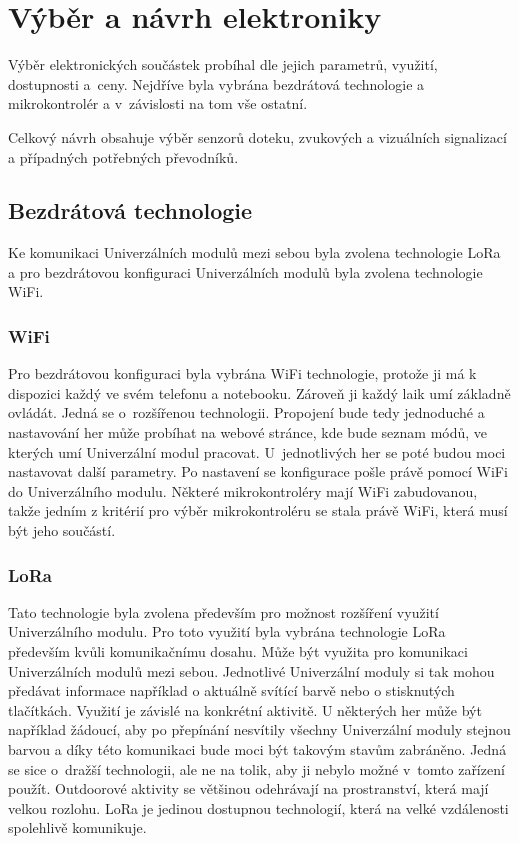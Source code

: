 \chapter{Výběr a návrh elektroniky}
Výběr elektronických součástek probíhal dle jejich parametrů, využití, dostupnosti a~ceny. Nejdříve byla vybrána bezdrátová technologie a mikrokontrolér a v~závislosti 
na tom vše ostatní. 

Celkový návrh obsahuje výběr senzorů doteku, zvukových a vizuálních signalizací a případných potřebných převodníků. 

\section{Bezdrátová technologie}
Ke komunikaci Univerzálních modulů mezi sebou byla zvolena technologie LoRa a pro bezdrátovou konfiguraci Univerzálních modulů byla zvolena technologie WiFi. 

\subsection{WiFi}
Pro bezdrátovou konfiguraci byla vybrána WiFi technologie, protože ji má k dispozici každý ve svém telefonu a notebooku. Zároveň ji každý laik umí základně ovládát. Jedná se 
o~rozšířenou technologii. 
Propojení bude tedy jednoduché a nastavování her může probíhat na webové stránce, kde bude seznam módů, ve kterých umí Univerzální modul pracovat. U~jednotlivých her se poté 
budou moci nastavovat 
další parametry. Po nastavení se konfigurace pošle právě pomocí WiFi do Univerzálního modulu. Některé mikrokontroléry mají WiFi zabudovanou, takže jedním z kritérií pro výběr 
mikrokontroléru se stala právě WiFi, která musí být jeho součástí. 

\subsection{LoRa}
Tato technologie byla zvolena především pro možnost rozšíření využití Univerzálního modulu. Pro toto využití byla vybrána technologie LoRa především kvůli komunikačnímu dosahu. 
Může být využita pro komunikaci Univerzálních modulů mezi sebou. Jednotlivé Univerzální moduly si tak mohou předávat informace například o aktuálně svítící barvě nebo o 
stisknutých tlačítkách. Využití je
závislé na konkrétní aktivitě. U některých her může být například žádoucí, aby po přepínání nesvítily všechny Univerzální moduly stejnou barvou a díky této komunikaci bude moci 
být takovým stavům zabráněno. Jedná se sice o~dražší technologii, 
ale ne na tolik, aby ji nebylo možné v~tomto zařízení použít. Outdoorové aktivity se většinou odehrávají na prostranství, která mají velkou rozlohu. LoRa je jedinou
dostupnou technologií, která na velké vzdálenosti spolehlivě komunikuje.  

